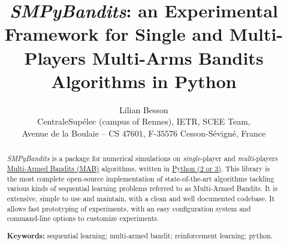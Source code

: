 \documentclass[a4paper,10pt,]{article}
\begin{document}
\title{\emph{SMPyBandits}: an Experimental Framework for Single and Multi-Players Multi-Arms Bandits Algorithms in Python}


\author{\name Lilian Besson  \\
        \addr CentraleSup\'elec (campus of Rennes), IETR, SCEE Team,\\
        Avenue de la Boulaie -- CS $47601$, F-$35576$ Cesson-S\'evign\'e, France
}

\date{}  %


\maketitle

\vspace*{10pt}

\begin{abstract}%
  \emph{SMPyBandits} is a package for numerical simulations on
  \emph{single}-player and \emph{multi}-players
  \href{https://en.wikipedia.org/wiki/Multi-armed_bandit}{Multi-Armed
  Bandits (MAB)} algorithms, written in
  \href{https://www.python.org/}{Python (2 or 3)}.
  This library is the most complete open-source implementation of
  state-of-the-art algorithms tackling various kinds of sequential
  learning problems referred to as Multi-Armed Bandits. It is
  extensive, simple to use and maintain, with a clean and well
  documented codebase. It allows fast prototyping of experiments,
  with an easy configuration system and command-line options
  to customize experiments.

  \textbf{Keywords:} sequential learning; multi-armed bandit; reinforcement learning; python.
\end{abstract}
\end{document}
